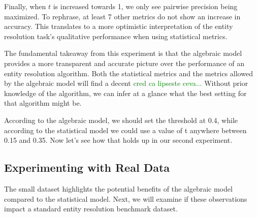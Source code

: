 \documentclass[lettersize,journal]{IEEEtran}
\begin{document}
    Finally, when $t$ is increased towards 1, we only see pairwise precision
    being maximized.
    To rephrase, at least 7 other metrics do not show an increase in accuracy.
    This translates to a more optimistic interpretation of the entity resolution
    task's qualitative performance when using statistical metrics.

    The fundamental takeaway from this experiment is that the algebraic model
    provides a more transparent and accurate picture over the performance of an
    entity resolution algorithm.
    Both the statistical metrics and the metrics allowed by the algebraic model
    will find a decent 
    \textcolor{green}{cred ca lipseste ceva...} 
    Without prior knowledge of the algorithm, we can infer at a glance what the
    best setting for that algorithm might be.
    
    According to the algebraic model, we should set the threshold at 0.4, while
    according to the statistical model we could use a value of t anywhere
    between 0.15 and 0.35.
    Now let's see how that holds up in our second experiment.
       

    \subsection{Experimenting with Real Data}

    The small dataset highlights the potential benefits of the algebraic model
    compared to the statistical model.
    Next, we will examine if these observations impact a standard entity
    resolution benchmark dataset.
\end{document}
